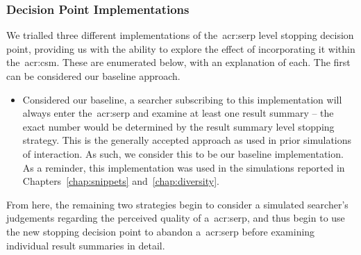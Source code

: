 \subsubsection{Decision Point Implementations}\label{sec:serp:method:serp_dp:implementations}
We trialled three different implementations of the~\gls{acr:serp} level stopping decision point, providing us with the ability to explore the effect of incorporating it within the~\gls{acr:csm}. These are enumerated below, with an explanation of each. The first can be considered our baseline approach.

\begin{itemize}
    \item{ Considered our baseline, a searcher subscribing to this implementation will always enter the~\gls{acr:serp} and examine at least one result summary -- the exact number would be determined by the result summary level stopping strategy. This is the generally accepted approach as used in prior simulations of interaction. As such, we consider this to be our baseline implementation. As a reminder, this implementation was used in the simulations reported in Chapters~\ref{chap:snippets} and~\ref{chap:diversity}.}
\end{itemize}

From here, the remaining two strategies begin to consider a simulated searcher's judgements regarding the perceived quality of a~\gls{acr:serp}, and thus begin to use the new stopping decision point to abandon a~\gls{acr:serp} before examining individual result summaries in detail.

